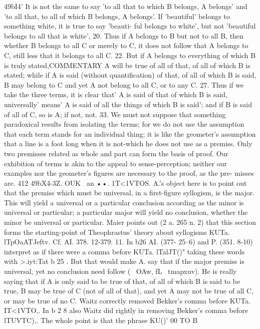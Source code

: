{{{{{{{{{{{{{{{{{{{{{{{{{{{{49bI4' It is not the same to say 'to all that to which B belongs,
A belongs' and 'to all that, to all of which B belongs, A belongs'.
If 'beautiful' belongs to something white, it is true to say 'beauti-
ful belongs to white', but not 'beautiful belongs to all that is
white',
20. Thus if A belongs to B but not to all B, then whether B
belongs to all C or merely to C, it does not follow that A belongs
to C, still less that it belongs to all C.
22. But if A belongs to everything of which B is truly stated,COMMENTARY
A will be true of all of that, of all of which B is stated; while if
A is said (without quantification) of that, of all of which B is
said, B may belong to C and yet A not belong to all C, or to any C.
27. Thus if we take the three terms, it is clear that' A is said
of that of which B is said, universally' means' A is said of all the
things of which B is said'; and if B is said of all of C, so is A;
if not, not.
33. We must not suppose that something paradoxical results
from isolating the terms; for we do not use the assumption that
each term stands for an individual thing; it is like the geometer's
assumption that a line is a foot long when it is not-which he
does not use as a premiss. Only two premisses related as whole
and part can form the basis of proof. Our exhibition of terms
is akin to the appeal to sense-perception; neither our examples
nor the geometer's figures are necessary to the proof, as the pre-
misses are.
412
49bX4-3Z. OUK ~an ••. 1T<1VTOS. A.'s object here is to point
out that the premiss which must be universal, in a first-figure
syllogism, is the major. This will yield a universal or a particular
conclusion according as the minor is universal or particular; a
particular major will yield no conclusion, whether the minor be
universal or particular.
Maier points out (2 a. 265 n. 2) that this section forms the
starting-point of Theophrastus' theory about syllogisms KUTa.
lTpOaATJeftv. Cf. AI. 378. 12-379. 11.
In b26 AI. (377- 25--6) and P. (351. 8-10) interpret as if there
were a comma before KUTa. lTalJT()" taking these words with
>.iyt:Tat b 25 . But that would make A. say that if the major premiss
is universal, yet no conclusion need follow (~ OAw, fL~ tmapxuv).
He is really saying that if A is only said to be true of that, of all
of which B is said to be true, B may be true of C (not of all of
that), and yet A may not be true of all C, or may be true of no C.
Waitz correctly removed Bekker's comma before KUTa. IT<1VTO,.
In b 2 8 also Waitz did rightly in removing Bekker's comma
before lTUVTC),. The whole point is that the phrase KU()' 00 TO B
}}}}}}}}}}}}}}}}}}}}}}}}}}}}
